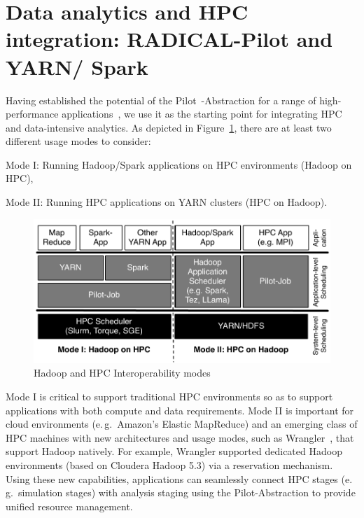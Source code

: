 \section{Data analytics and HPC integration: RADICAL-Pilot and YARN/ Spark}
\label{sec:integration_mode}
Having established the potential of the Pilot~-Abstraction for a range of high-performance applications~\cite{treikalis2016repex,ragothaman2014developing,ko2014numerical}, we use it as the starting point for integrating HPC and data-intensive analytics.
As depicted in Figure~\ref{fig:figures_hadoop-on-hpc-viceverse}, there are at least two different usage modes to consider:
\begin{inparaenum}[1)]
    \item Mode I: Running Hadoop/Spark applications on HPC environments (Hadoop on HPC),
    \item Mode II: Running HPC applications on YARN clusters (HPC on Hadoop).
\end{inparaenum}

\begin{figure}[t]
    \centering
    \includegraphics[width=.85\textwidth]{figures/data_analytics_hpc/hpc_hadoop/hadoop-on-hpc-viceverse.pdf}
    \caption{Hadoop and HPC Interoperability modes\label{fig:figures_hadoop-on-hpc-viceverse}}
\end{figure}

Mode I is critical to support traditional HPC environments so as to support applications with both compute and data requirements.
Mode II is important for cloud environments (e.\,g.\ Amazon's Elastic MapReduce) and an emerging class of HPC machines with new architectures and usage modes, such as Wrangler~\cite{wrangler}, that support Hadoop natively.
For example, Wrangler supported dedicated Hadoop environments (based on Cloudera Hadoop 5.3) via a reservation mechanism.
Using these new capabilities, applications can seamlessly connect HPC stages (e.\,g.\ simulation stages) with analysis staging using the Pilot-Abstraction to provide unified resource management.

